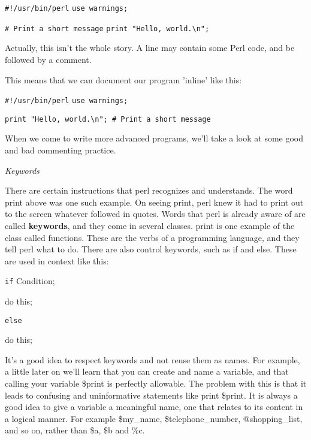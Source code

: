 \documentclass[a4paper,12pt,twoside]{book}
\begin{document}
\noindent \texttt{\#!/usr/bin/perl}
\noindent \texttt{use warnings;}

\noindent 

\noindent \texttt{\# Print a short message}
\noindent \texttt{print "Hello, world.\textbackslash n";}

\noindent 

\noindent 

\noindent Actually, this isn't the whole story. A line may contain some Perl code, and be followed by a comment.

\noindent This means that we can document our program 'inline' like this:

\noindent 

\noindent 

\noindent \texttt{\#!/usr/bin/perl}
\noindent \texttt{use warnings;}

\noindent 

\noindent \texttt{print "Hello, world.\textbackslash n"; \# Print a short message}

\noindent 

\noindent When we come to write more advanced programs, we'll take a look at some good and bad commenting practice.

\noindent 

\noindent \textit{Keywords}

\noindent There are certain instructions that perl recognizes and understands. The word print above was one such example. On seeing print, perl knew it had to print out to the screen whatever followed in quotes. Words that perl is already aware of are called \textbf{keywords}, and they come in several classes. print is one example of the class called functions. These are the verbs of a programming language, and they tell perl what to do. There are also control keywords, such as if and else. These are used in context like this:

\noindent 

\noindent \texttt{if} Condition;

\noindent do this;

\noindent 

\noindent \texttt{else}

\noindent do this;

\noindent 

\noindent It's a good idea to respect keywords and not reuse them as names. For example, a little later on we'll learn that you can create and name a variable, and that calling your variable \$print is perfectly allowable. The problem with this is that it leads to confusing and uninformative statements like print \$print. It is always a good idea to give a variable a meaningful name, one that relates to its content in a logical manner. For example \$my\_name, \$telephone\_number, @shopping\_list, and so on, rather than \$a, \$b and \%c.
\end{document}
